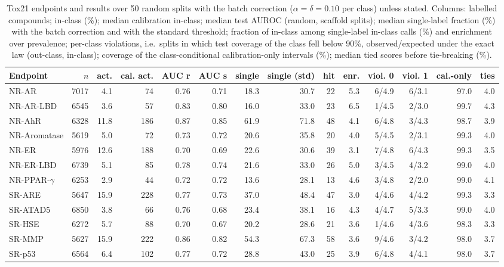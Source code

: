 \begin{table}[ht]
\centering
\caption{Tox21 endpoints and results over 50 random splits with the batch correction ($\alpha=\delta=0.10$ per class) unless stated. Columns: labelled compounds; in-class (\%); median calibration in-class; median test AUROC (random, scaffold splits); median single-label fraction (\%) with the batch correction and with the standard threshold; fraction of in-class among single-label in-class calls (\%) and enrichment over prevalence; per-class violations, i.e.\ splits in which test coverage of the class fell below 90\%, observed/expected under the exact law (out-class, in-class); coverage of the class-conditional calibration-only intervals (\%); median tied scores before tie-breaking (\%).}
\label{tab:tox21data}
\small
\setlength{\tabcolsep}{2.6pt}
\begin{tabular}{lrrrrrrrrrrrrr}
\toprule
Endpoint & $n$ & act. & cal. act. & AUC r & AUC s & single & single (std) & hit & enr. & viol. 0 & viol. 1 & cal.-only & ties \\
\midrule
NR-AR & 7017 & 4.1 & 74 & 0.76 & 0.71 & 18.3 & 30.7 & 22 & 5.3 & 6/4.9 & 6/3.1 & 97.0 & 4.0 \\
NR-AR-LBD & 6545 & 3.6 & 57 & 0.83 & 0.80 & 16.0 & 33.0 & 23 & 6.5 & 1/4.5 & 2/3.0 & 99.7 & 4.3 \\
NR-AhR & 6328 & 11.8 & 186 & 0.87 & 0.85 & 61.9 & 71.8 & 48 & 4.1 & 6/4.8 & 3/4.3 & 98.7 & 3.9 \\
NR-Aromatase & 5619 & 5.0 & 72 & 0.73 & 0.72 & 20.6 & 35.8 & 20 & 4.0 & 5/4.5 & 2/3.1 & 99.3 & 4.0 \\
NR-ER & 5976 & 12.6 & 188 & 0.70 & 0.69 & 22.6 & 30.6 & 39 & 3.1 & 7/4.8 & 6/4.3 & 99.3 & 3.5 \\
NR-ER-LBD & 6739 & 5.1 & 85 & 0.78 & 0.74 & 21.6 & 33.0 & 26 & 5.0 & 3/4.5 & 4/3.2 & 99.0 & 4.0 \\
NR-PPAR-$\gamma$ & 6253 & 2.9 & 44 & 0.72 & 0.72 & 13.6 & 28.1 & 13 & 4.6 & 3/4.8 & 2/2.0 & 99.0 & 4.1 \\
SR-ARE & 5647 & 15.9 & 228 & 0.77 & 0.73 & 37.0 & 48.4 & 47 & 3.0 & 4/4.6 & 4/4.2 & 99.3 & 3.3 \\
SR-ATAD5 & 6850 & 3.8 & 66 & 0.76 & 0.68 & 23.4 & 38.1 & 16 & 4.3 & 4/4.7 & 5/3.3 & 99.0 & 4.0 \\
SR-HSE & 6272 & 5.7 & 88 & 0.70 & 0.67 & 20.2 & 28.6 & 21 & 3.6 & 1/4.6 & 4/3.6 & 98.3 & 3.3 \\
SR-MMP & 5627 & 15.9 & 222 & 0.86 & 0.82 & 54.3 & 67.3 & 58 & 3.6 & 9/4.6 & 3/4.2 & 98.0 & 3.7 \\
SR-p53 & 6564 & 6.4 & 102 & 0.77 & 0.72 & 28.8 & 43.0 & 25 & 3.9 & 6/4.8 & 4/4.1 & 98.0 & 3.7 \\
\bottomrule
\end{tabular}
\end{table}
